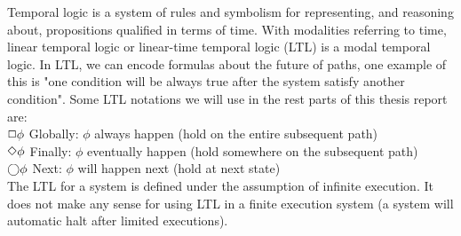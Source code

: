 Temporal logic is a system of rules and symbolism for representing, and reasoning about, propositions qualified in terms of time. With modalities referring to time, linear temporal logic or linear-time temporal logic (LTL) is a modal temporal logic. In LTL, we can encode formulas about the future of paths, one example of this is "one condition will be always true after the system satisfy another condition". Some LTL notations we will use in the rest parts of this thesis report are:\\
$\Box\phi$	Globally: $\phi$ always happen (hold on the entire subsequent path)\\
$\Diamond\phi$	Finally: $\phi$ eventually happen (hold somewhere on the subsequent path)\\
$\bigcirc\phi$	Next: $\phi$ will happen next (hold at next state)\\
The LTL for a system is defined under the assumption of infinite execution. It does not make any sense for using LTL in a finite execution system (a system will automatic halt after limited executions).\\
